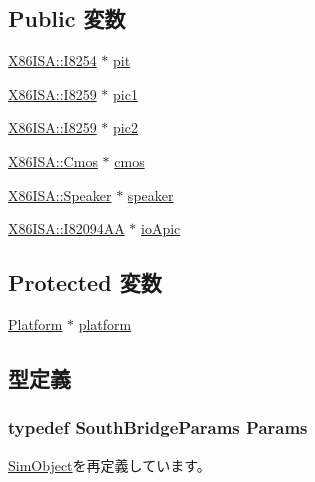 \subsection*{Public 変数}
\begin{DoxyCompactItemize}
\item 
\hyperlink{classX86ISA_1_1I8254}{X86ISA::I8254} $\ast$ \hyperlink{classSouthBridge_a23d6b963b81d9a1650dda290fdebaf02}{pit}
\item 
\hyperlink{classX86ISA_1_1I8259}{X86ISA::I8259} $\ast$ \hyperlink{classSouthBridge_ad9a98b1ebc5ae327a00f09724d5bcc54}{pic1}
\item 
\hyperlink{classX86ISA_1_1I8259}{X86ISA::I8259} $\ast$ \hyperlink{classSouthBridge_a323da467db393577cb19495718bcd12b}{pic2}
\item 
\hyperlink{classX86ISA_1_1Cmos}{X86ISA::Cmos} $\ast$ \hyperlink{classSouthBridge_abec6154e026373a584b921015fcbd758}{cmos}
\item 
\hyperlink{classX86ISA_1_1Speaker}{X86ISA::Speaker} $\ast$ \hyperlink{classSouthBridge_a0c67494091d5f123bd1f8b55a4ae428b}{speaker}
\item 
\hyperlink{classX86ISA_1_1I82094AA}{X86ISA::I82094AA} $\ast$ \hyperlink{classSouthBridge_ae92a1993015ab9d02338732ee289fd6d}{ioApic}
\end{DoxyCompactItemize}
\subsection*{Protected 変数}
\begin{DoxyCompactItemize}
\item 
\hyperlink{classPlatform}{Platform} $\ast$ \hyperlink{classSouthBridge_a75b48f1787959a4617f2a599d7c09aab}{platform}
\end{DoxyCompactItemize}


\subsection{型定義}
\hypertarget{classSouthBridge_a627de7f454b8e2cbe120a7d6b67a4620}{
\subsubsection[{Params}]{\setlength{\rightskip}{0pt plus 5cm}typedef SouthBridgeParams {\bf Params}}}
\label{classSouthBridge_a627de7f454b8e2cbe120a7d6b67a4620}


\hyperlink{classSimObject_a0f0761d2db586a23bb2a2880b8f387bb}{SimObject}を再定義しています。

